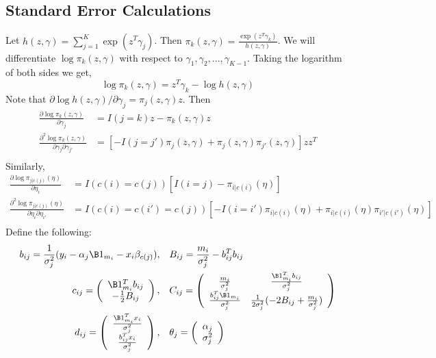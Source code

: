 \subsection{Standard Error Calculations}
Let $h(z,\gamma)=\sum^{K}_{j=1}\exp(z^{T}\gamma_{j})$. Then $\pi_{k}(z,\gamma)=\frac{\exp(z^{T}\gamma_{k})}{h(z,\gamma)}$. We will differentiate $\log\pi_{k}(z,\gamma)$ with respect to $\gamma_{1},\gamma_{2},...,\gamma_{K-1}$. Taking the logarithm of both sides we get,
$$\log\pi_{k}(z,\gamma)=z^{T}\gamma_{k}-\log h(z,\gamma)$$
Note that $\partial \log h(z,\gamma)/\partial \gamma_{j}=\pi_{j}(z,\gamma)z$. Then
\begin{align*}
\frac{\partial \log\pi_{k}(z,\gamma) }{\partial \gamma_{j}} &= I(j=k)z-\pi_{k}(z,\gamma)z\\
\frac{\partial^{2} \log\pi_{k}(z,\gamma) }{\partial \gamma_{j}\partial \gamma_{j'}} &= [-I(j=j')\pi_{j}(z,\gamma)+\pi_{j}(z,\gamma)\pi_{j'}(z,\gamma)]zz^{T}\\
\end{align*}
Similarly, 
\begin{align*}
\frac{\partial \log\pi_{j|c(j)}(\eta) }{\partial \eta_{i}} &= I(c(i)=c(j))\left[I(i=j)-\pi_{i|c(i)}(\eta)\right]\\
\frac{\partial^{2} \log\pi_{j|c(j)}(\eta) }{\partial \eta_{i}\partial \eta_{i'}} &= I(c(i)=c(i')=c(j))\left[-I(i=i')\pi_{i|c(i)}(\eta)+\pi_{i|c(i)}(\eta)\pi_{i'|c(i')}(\eta)\right]\\
\end{align*}
Define the following:
\begin{align*}
b_{ij} = \frac{1}{\sigma_{j}^{2}}(y_{i}-\alpha_{j}\B 1_{m_i}-x_{i}\beta_{c(j)}),&\quad B_{ij}=\frac{m_{i}}{\sigma^{2}_{j}}-b_{ij}^{T}b_{ij}\\
c_{ij} = \left(\begin{array}{c}
\B 1_{m_i}^{T} b_{ij}\\
-\frac{1}{2}B_{ij}
\end{array}\right),&\quad C_{ij} =\left(\begin{array}{cc}
\frac{m_{i}}{\sigma^{2}_{j}}&\frac{\B 1_{m_i}^{T}b_{ij}}{\sigma^{2}_{j}}\\
\frac{b^{T}_{ij}\B 1_{m_i}}{\sigma^{2}_{j}}&\frac{1}{2\sigma_{j}^{2}}(-2B_{ij}+\frac{m_{i}}{\sigma^{2}_{j}})
\end{array}\right)\\
d_{ij}=\left(\begin{array}{c}
\frac{\B 1_{m_i}^{T}x_{i}}{\sigma^{2}_{j}}\\
\frac{b_{ij}^{T}x_{i}}{\sigma^{2}_{j}}\end{array}\right),&
\quad \theta_{j}=\left(\begin{array}{c}
\alpha_{j}\\
\sigma_{j}^{2}\end{array}\right)
\end{align*}
